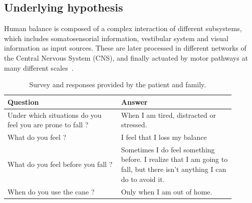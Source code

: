 \documentclass[conference]{IEEEtran}
\begin{document}
\subsection{Underlying hypothesis}
\label{sec:hypothesis}

Human balance is composed of a complex interaction of different subsystems, which includes somatosensorial information, vestibular system and visual information as input sources.  These are later processed in different networks of the Central Nervous System (CNS), and finally actuated by motor pathways at many different scales~\cite{Donato.etal2016}.

\begin{table}[t]
\begin{center}
\begin{tabular}[!t]{|p{0.45\linewidth} |p{0.45\linewidth} |}
\hline
\textbf{Question} & \textbf{Answer} \\
\hline
\hline
Under which situations do you feel you are prone to fall ? & When I am tired, distracted or stressed. \\
\hline
What do you feel ?  & I feel that I loss my balance\\
\hline
What do you feel before you fall ? & Sometimes I do feel something before.  I realize that I am going to fall, but there isn't anything I can do to avoid it. \\
\hline
When do you use the cane ?  & Only when I am out of home.\\
\hline
\end{tabular}
\vspace{2pt}
\caption{Survey and responses provided by the patient and family.}
\label{tab:patientsurvey}
\end{center}
\end{table}
\end{document}
